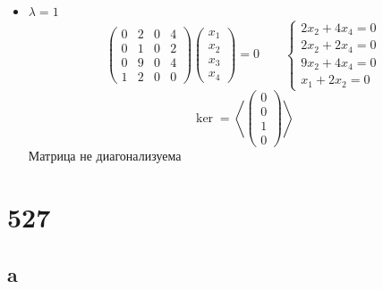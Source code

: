 \begin{itemize}
	\item $ \lambda = 1 $
    $$
    \begin{pmatrix}
    	0 & 2 & 0 & 4 \\
        0 & 1 & 0 & 2 \\
        0 & 9 & 0 & 4 \\
        1 & 2 & 0 & 0
    \end{pmatrix}
    \begin{pmatrix}
    	x_1 \\
        x_2 \\
        x_3 \\
        x_4
    \end{pmatrix} = 0 \qquad
    \begin{cases}
    	2x_2 + 4x_4 = 0 \\
        2x_2 + 2x_4 = 0 \\
        9x_2 + 4x_4 = 0 \\
        x_1 + 2x_2 = 0
    \end{cases} $$
    $$ \ker = \left\langle
    \begin{pmatrix}
    	0 \\
        0 \\
        1 \\
        0
    \end{pmatrix} \right\rangle $$
    Матрица не диагонализуема
\end{itemize}

\section{527}

\subsection{a}

